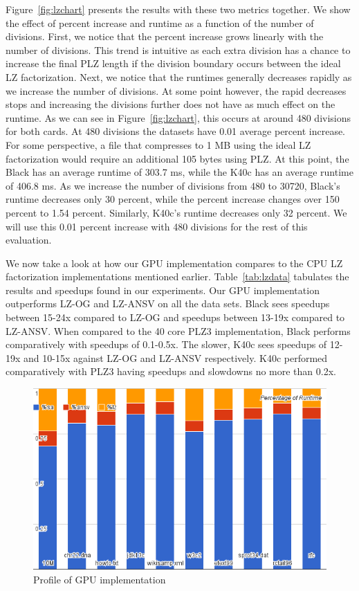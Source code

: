 Figure~\ref{fig:lzchart} presents the results with these two metrics together.
We show the effect of percent increase and runtime as a function of the number of divisions.
First, we notice that the percent increase grows linearly with the number of divisions.
This trend is intuitive as each extra division has a chance to increase the final PLZ length if the division boundary occurs between the ideal LZ factorization.
Next, we notice that the runtimes generally decreases rapidly as we increase the number of divisions.
At some point however, the rapid decreases stops and increasing the divisions further does not have as much effect on the runtime.
As we can see in Figure~\ref{fig:lzchart}, this occurs at around 480 divisions for both cards.
At 480 divisions the datasets have 0.01 average percent increase.
For some perspective, a file that compresses to 1 MB using the ideal LZ factorization would require an additional 105 bytes using PLZ.
At this point, the Black has an average runtime of 303.7 ms, while the K40c has an average runtime of 406.8 ms.
As we increase the number of divisions from 480 to 30720, Black's runtime decreases only 30 percent, while the percent increase changes over 150 percent to 1.54 percent.
Similarly, K40c's runtime decreases only 32 percent.
We will use this 0.01 percent increase with 480 divisions for the rest of this evaluation.

We now take a look at how our GPU implementation compares to the CPU LZ factorization implementations mentioned earlier.
Table~\ref{tab:lzdata} tabulates the results and speedups found in our experiments.
Our GPU implementation outperforms LZ-OG and LZ-ANSV on all the data sets.
Black sees speedups between 15-24x compared to LZ-OG and speedups between 13-19x compared to LZ-ANSV.
When compared to the 40 core PLZ3 implementation, Black performs comparatively with speedups of 0.1-0.5x.
The slower, K40c sees speedups of 12-19x and 10-15x against LZ-OG and LZ-ANSV respectively.
K40c performed comparatively with PLZ3 having speedups and slowdowns no more than 0.2x.

\begin{figure}[ht!]
\centering
\includegraphics[width=1.0\textwidth]{images/allprof.png}
\caption{Profile of GPU implementation}
\label{fig:allprof}
\end{figure}

